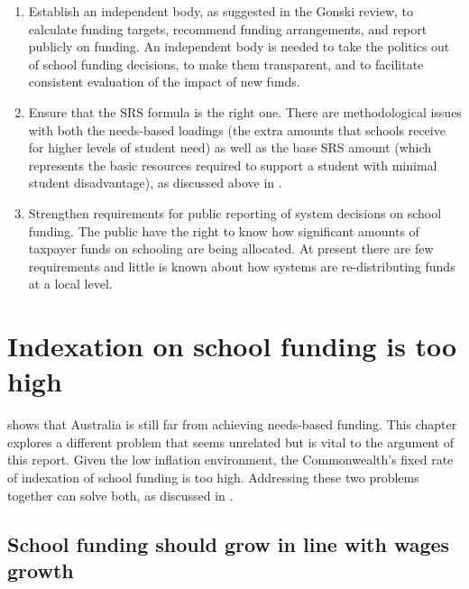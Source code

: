 \documentclass{grattan}
\begin{document}
\begin{enumerate}[leftmargin=1.5em]

\item Establish an independent body, as suggested in the Gonski review, to calculate funding targets, recommend funding arrangements, and report publicly on funding. An independent body is needed to take the politics out of school funding decisions, to make them transparent, and to facilitate consistent evaluation of the impact of new funds.

\item Ensure that the SRS formula is the right one. There are methodological issues with both the needs-based loadings (the extra amounts that schools receive for higher levels of student need) as well as the base SRS amount (which represents the basic resources required to support a student with minimal student disadvantage), as discussed above in
.

\item Strengthen requirements for public reporting of system decisions on school funding. The public have the right to know how significant amounts of taxpayer funds on schooling are being allocated. At present there are few requirements and little is known about how systems are re-distributing funds at a local level.
\end{enumerate}

\chapter{Indexation on school funding is too high}\label{chap:indexation-on-school-funding-is-too-high}

 shows that Australia is still far from achieving needs-based funding.
This chapter explores a different problem that seems unrelated but is vital to the argument of this report. Given the low inflation environment, the Commonwealth's fixed rate of indexation of school funding is too high. Addressing these two problems together can solve both, as discussed in .

\section{School funding should grow in line with wages growth}\label{sec:school-funding-should-grow-in-line-with-wages-growth}
\end{document}
